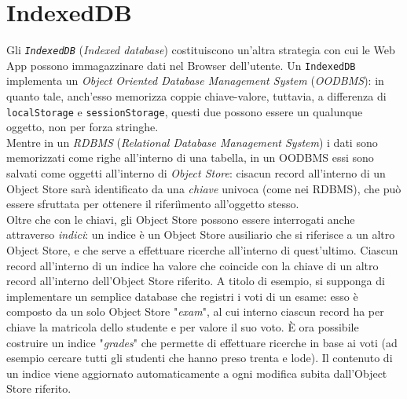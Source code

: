 \documentclass[a4paper, 12pt, twoside, openright]{book}
\begin{document}
\section{IndexedDB} %
Gli \textit{\texttt{IndexedDB}} (\textit{Indexed database}) costituiscono un'altra strategia con cui le Web App possono immagazzinare dati nel Browser dell'utente. Un \texttt{IndexedDB} implementa un \textit{Object Oriented Database Management System} (\textit{OODBMS}): in quanto tale, anch'esso memorizza coppie chiave-valore, tuttavia, a differenza di \texttt{localStorage} e \texttt{sessionStorage}, questi due possono essere un qualunque oggetto, non per forza stringhe.\\
Mentre in un \textit{RDBMS} (\textit{Relational Database Management System}) i dati sono memorizzati come righe all'interno di una tabella, in un OODBMS essi sono salvati come oggetti all'interno di \textit{Object Store}: cisacun record all'interno di un Object Store sarà identificato da una \textit{chiave} univoca (come nei RDBMS), che può essere sfruttata per ottenere il riferiìmento all'oggetto stesso.\\
Oltre che con le chiavi, gli Object Store possono essere interrogati anche attraverso \textit{indici}: un indice è un Object Store ausiliario che si riferisce a un altro Object Store, e che serve a effettuare ricerche all'interno di quest'ultimo. Ciascun record all'interno di un indice ha valore che coincide con la chiave di un altro record all'interno dell'Object Store riferito. A titolo di esempio, si supponga di implementare un semplice database che registri i voti di un esame: esso è composto da un solo Object Store "\textit{exam}", al cui interno ciascun record ha per chiave la matricola dello studente e per valore il suo voto. È ora possibile costruire un indice "\textit{grades}" che permette di effettuare ricerche in base ai voti (ad esempio cercare tutti gli studenti che hanno preso trenta e lode). Il contenuto di un indice viene aggiornato automaticamente a ogni modifica subita dall'Object Store riferito.\\
\backmatter

\begingroup %
  \makeatletter
  \let\ps@plain\ps@empty
  \makeatother
  
\endgroup
\end{document}
